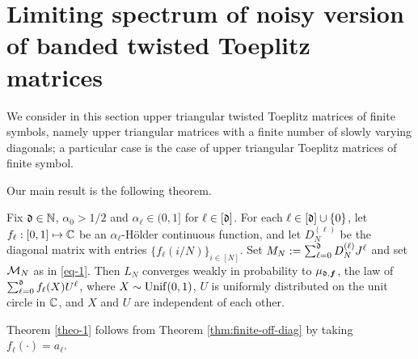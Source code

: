 \documentclass{amsart}
\numberwithin{equation}{section}
\def\corOZ{}
\begin{document}
\section{Limiting spectrum of noisy version of banded twisted Toeplitz matrices}
\label{sec:tt}
We consider in this section upper triangular
twisted Toeplitz matrices of finite symbols, namely upper triangular
matrices with a finite number of slowly varying diagonals; a particular
case is the case of upper triangular Toeplitz matrices of finite symbol.

Our main result is the following theorem.
\begin{theorem}\label{thm:finite-off-diag}
Fix $\mathfrak{d} \in \mathbb N$, \corOZ{$\alpha_0>1/2$ and $\alpha_\ell\in (0,1]$ for
$\ell \in [\mathfrak{d}]$.}
  For  each $\ell \in [\mathfrak{d}]\cup\{0\}$,
let $f_\ell: [0,1] \mapsto \mathbb{C}$ be an
$\alpha_\ell$-H\"{o}lder continuous function,
\corOZ{and let}
$D_N^{(\ell)}$ be the diagonal matrix with entries
$\{f_\ell(i/N)\}_{i \in [N]}$.  Set
$M_N:= \sum_{\ell=0}^{\mathfrak{d}} D_N^{(\ell)} J^\ell$ and set $\mathcal{M}_N$
as in \eqref{eq-1}. Then $L_N$ converges weakly in
probability to $\mu_{\mathfrak{d}, {\bm f}}$, the law
of  $\sum_{\ell=0}^{\mathfrak{d}} f_\ell(X) U^\ell$,
where $X \sim {\rm{Unif}}(0,1)$,
$U$ is uniformly distributed
on the unit circle in $\mathbb{C}$, and
$X$ and $U$ are independent of each other.
\end{theorem}
\begin{remark}
  Theorem \ref{theo-1} follows from Theorem \ref{thm:finite-off-diag}
  by taking $f_\ell(\cdot)=a_\ell$.
\end{remark}
\end{document}
